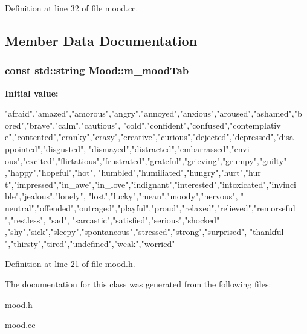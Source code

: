 Definition at line 32 of file mood.cc.



\subsection{Member Data Documentation}
\hypertarget{classMood_a110791200b2f61f50d059d0bf045c005}{
\subsubsection[{m\_\-moodTab}]{\setlength{\rightskip}{0pt plus 5cm}const std::string Mood::m\_\-moodTab}}
\label{classMood_a110791200b2f61f50d059d0bf045c005}
{\bfseries Initial value:}
\begin{DoxyCode}
 { "afraid","amazed","amorous","angry","annoyed","anxious","aroused","ashamed","b
      ored","brave","calm","cautious",
                                      "cold","confident","confused","contemplativ
      e","contented","cranky","crazy","creative","curious","dejected","depressed","disa
      ppointed","disgusted",
                                      "dismayed","distracted","embarrassed","envi
      ous","excited","flirtatious","frustrated","grateful","grieving","grumpy","guilty"
      ,"happy","hopeful","hot",
                                      "humbled","humiliated","hungry","hurt","hur
      t","impressed","in_awe","in_love","indignant","interested","intoxicated","invinci
      ble","jealous","lonely",
                                      "lost","lucky","mean","moody","nervous",   "
      neutral","offended","outraged","playful","proud","relaxed","relieved","remorseful
      ","restless",  "sad",
                                      "sarcastic","satisfied","serious","shocked"
      ,"shy","sick","sleepy","spontaneous","stressed","strong","surprised",   "thankful
      ","thirsty","tired","undefined","weak","worried"}
\end{DoxyCode}


Definition at line 21 of file mood.h.



The documentation for this class was generated from the following files:\begin{DoxyCompactItemize}
\item 
\hyperlink{mood_8h}{mood.h}\item 
\hyperlink{mood_8cc}{mood.cc}\end{DoxyCompactItemize}

